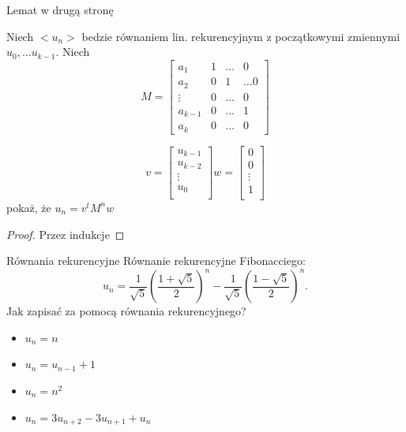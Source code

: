 \documentclass{beamer}
\theoremstyle{definition}
\begin{document}
\begin{frame}{Lemat w drugą stronę}
\begin{theorem}
    Niech $<u_n>$ bedzie równaniem lin. rekurencyjnym z początkowymi zmiennymi $u_0, \ldots u_{k-1}$. 
    Niech
    $$
    M = \begin{bmatrix}
    a_{1} & 1 &  \ldots & 0 \\
    a_{2} & 0 & 1 & \ldots 0  \\
    \vdots & 0 & \ldots & 0 \\ 
    a_{k-1} & 0 & \ldots & 1 \\
    a_{k} & 0 & \ldots & 0
    \end{bmatrix}
    $$

    $$v= \begin{bmatrix}
    u_{k-1} \\ u_{k-2} \\ \vdots \\ u_{0} \\
    \end{bmatrix}
    w =  \begin{bmatrix}
    0 \\ 0 \\ \vdots \\ 1 \\
    \end{bmatrix}
    $$
    pokaż, że $u_n = v^{t} M^{n} w$
\end{theorem}
\begin{proof}
    Przez indukcje
\end{proof}
\end{frame}



\begin{frame}{Równania rekurencyjne}
Równanie rekurencyjne Fibonacciego: 
$$
{\displaystyle u_{n}={\frac {1}{\sqrt {5}}}\left({\frac {1+{\sqrt {5}}}{2}}\right)^{n}-{\frac {1}{\sqrt {5}}}\left({\frac {1-{\sqrt {5}}}{2}}\right)^{n}.}
$$
 Jak zapisać za pomocą równania rekurencyjnego? 
\begin{itemize}
    \item  $u_n = n$
    \pause 
    \item $u_n = u_{n-1} + 1$
    \pause
    \item  $u_n = n^{2}$
    \pause
    \item $u_n = 3 u_{n+2} - 3u_{n+1} + u_n$

\end{itemize}

\end{frame}
\end{document}
